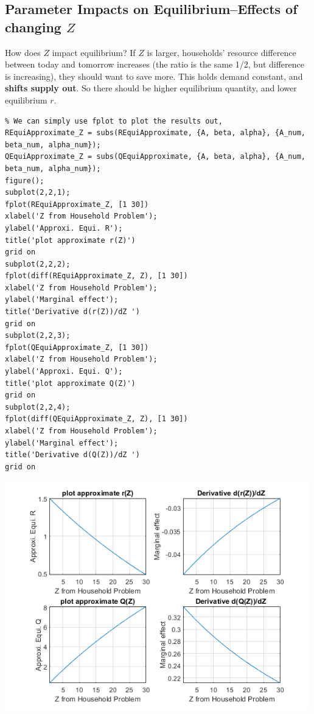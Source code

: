 \documentclass[
]{book}
\begin{document}
\hypertarget{parameter-impacts-on-equilibriumeffects-of-changing-z}{%
\subsection{\texorpdfstring{Parameter Impacts on Equilibrium--Effects of changing \(Z\)}{Parameter Impacts on Equilibrium--Effects of changing Z}}\label{parameter-impacts-on-equilibriumeffects-of-changing-z}}

How does \(Z\) impact equilibrium? If \(Z\) is larger, households' resource
difference between today and tomorrow increases (the ratio is the same
1/2, but difference is increasing), they should want to save more. This
holds demand constant, and \textbf{shifts supply out}. So there should be
higher equilibrium quantity, and lower equilibrium \(r\).

\begin{verbatim}
% We can simply use fplot to plot the results out, 
REquiApproximate_Z = subs(REquiApproximate, {A, beta, alpha}, {A_num, beta_num, alpha_num});
QEquiApproximate_Z = subs(QEquiApproximate, {A, beta, alpha}, {A_num, beta_num, alpha_num});
figure();
subplot(2,2,1);
fplot(REquiApproximate_Z, [1 30])
xlabel('Z from Household Problem');
ylabel('Approxi. Equi. R');
title('plot approximate r(Z)')
grid on
subplot(2,2,2);
fplot(diff(REquiApproximate_Z, Z), [1 30])
xlabel('Z from Household Problem');
ylabel('Marginal effect');
title('Derivative d(r(Z))/dZ ')
grid on
subplot(2,2,3);
fplot(QEquiApproximate_Z, [1 30])
xlabel('Z from Household Problem');
ylabel('Approxi. Equi. Q');
title('plot approximate Q(Z)')
grid on
subplot(2,2,4);
fplot(diff(QEquiApproximate_Z, Z), [1 30])
xlabel('Z from Household Problem');
ylabel('Marginal effect');
title('Derivative d(Q(Z))/dZ ')
grid on
\end{verbatim}

\includegraphics[width=5.20833in,height=\textheight]{img/demand_supply_taylor_approximate_capital_images/figure_2.png}
\end{document}
